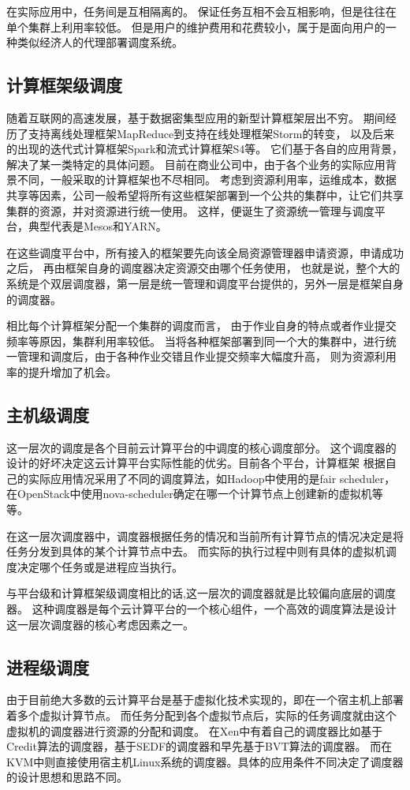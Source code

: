在实际应用中，任务间是互相隔离的。
保证任务互相不会互相影响，但是往往在单个集群上利用率较低。
但是用户的维护费用和花费较小，属于是面向用户的一种类似经济人的代理部署调度系统。
\subsection{计算框架级调度}
随着互联网的高速发展，基于数据密集型应用的新型计算框架层出不穷。
期间经历了支持离线处理框架MapReduce到支持在线处理框架Storm的转变，
以及后来的出现的迭代式计算框架Spark和流式计算框架S4等\cite{ref15}。
它们基于各自的应用背景，解决了某一类特定的具体问题。
目前在商业公司中，由于各个业务的实际应用背景不同，一般采取的计算框架也不尽相同。
考虑到资源利用率，运维成本，数据共享等因素，公司一般希望将所有这些框架部署到一个公共的集群中，让它们共享集群的资源，并对资源进行统一使用。
这样，便诞生了资源统一管理与调度平台，典型代表是Mesos和YARN。

在这些调度平台中，所有接入的框架要先向该全局资源管理器申请资源，申请成功之后，
再由框架自身的调度器决定资源交由哪个任务使用，
也就是说，整个大的系统是个双层调度器，第一层是统一管理和调度平台提供的，另外一层是框架自身的调度器。

相比每个计算框架分配一个集群的调度而言，
由于作业自身的特点或者作业提交频率等原因，集群利用率较低。
当将各种框架部署到同一个大的集群中，进行统一管理和调度后，由于各种作业交错且作业提交频率大幅度升高，
则为资源利用率的提升增加了机会。
\subsection{主机级调度}
这一层次的调度是各个目前云计算平台的中调度的核心调度部分。
这个调度器的设计的好坏决定这云计算平台实际性能的优劣。目前各个平台，计算框架
根据自己的实际应用情况采用了不同的调度算法，如Hadoop中使用的是fair scheduler，
在OpenStack中使用nova-scheduler确定在哪一个计算节点上创建新的虚拟机等等。

在这一层次调度器中，调度器根据任务的情况和当前所有计算节点的情况决定是将任务分发到具体的某个计算节点中去。
而实际的执行过程中则有具体的虚拟机调度决定哪个任务或是进程应当执行。

与平台级和计算框架级调度相比的话,这一层次的调度器就是比较偏向底层的调度器。
这种调度器是每个云计算平台的一个核心组件，一个高效的调度算法是设计这一层次调度器的核心考虑因素之一。


\subsection{进程级调度}
由于目前绝大多数的云计算平台是基于虚拟化技术实现的，即在一个宿主机上部署着多个虚拟计算节点。
而任务分配到各个虚拟节点后，实际的任务调度就由这个虚拟机的调度器进行资源的分配和调度。
在Xen中有着自己的调度器比如基于Credit算法的调度器，基于SEDF的调度器和早先基于BVT算法的调度器。
而在KVM中则直接使用宿主机Linux系统的调度器。具体的应用条件不同决定了调度器的设计思想和思路不同。

